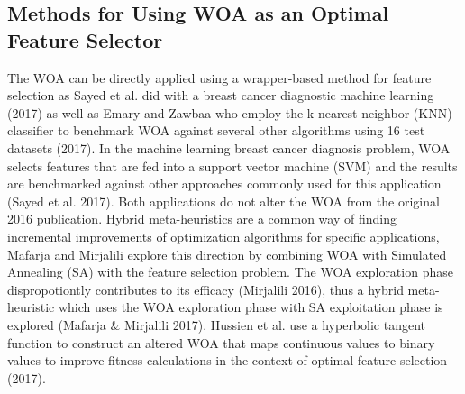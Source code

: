 \documentclass[11pt]{article}
\begin{document}
{{\subsection*{Methods for Using WOA as an Optimal Feature Selector} {
    The WOA can be directly applied using a wrapper-based method for feature selection as Sayed et al. did with a breast cancer diagnostic machine learning (2017) as well as Emary and Zawbaa who employ the k-nearest neighbor (KNN) classifier to benchmark WOA against several other algorithms using 16 test datasets (2017).
    In the machine learning breast cancer diagnosis problem, WOA selects features that are fed into a support vector machine (SVM) and the results are benchmarked against other approaches commonly used for this application (Sayed et al. 2017).
    Both applications do not alter the WOA from the original 2016 publication.
    Hybrid meta-heuristics are a common way of finding incremental improvements of optimization algorithms for specific applications, Mafarja and Mirjalili explore this direction by combining WOA with Simulated Annealing (SA) with the feature selection problem.
    The WOA exploration phase dispropotiontly contributes to its efficacy (Mirjalili 2016), thus a hybrid meta-heuristic which uses the WOA exploration phase with SA exploitation phase is explored (Mafarja \& Mirjalili 2017).
    Hussien et al. use a hyperbolic tangent function to construct an altered WOA that maps continuous values to binary values to improve fitness calculations in the context of optimal feature selection (2017).
}

}}
\end{document}
